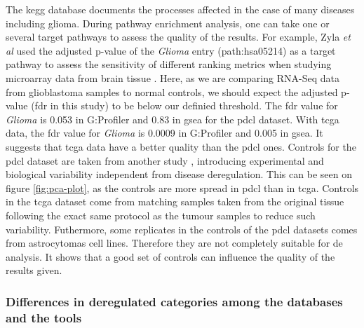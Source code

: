 The \acrshort{kegg} database documents the processes affected in the case of many diseases including glioma.
During pathway enrichment analysis, one can take one or several target pathways to assess the quality of the results.
For example, Zyla \textit{et al} used the adjusted p-value of the \textit{Glioma} entry (path:hsa05214) as a target pathway to assess the sensitivity of different ranking metrics when studying microarray data from brain tissue \cite*{Zyla2017}.
Here, as we are comparing RNA-Seq data from glioblastoma samples to normal controls, we should expect the adjusted p-value (\acrshort{fdr} in this study) to be below our definied threshold.
The \acrshort{fdr} value for \textit{Glioma} is 0.053 in G:Profiler and 0.83 in \acrshort{gsea} for the \acrshort{pdcl} dataset.
With \acrshort{tcga} data, the \acrshort{fdr} value for \textit{Glioma} is 0.0009 in G:Profiler and 0.005 in \acrshort{gsea}.
It suggests that \acrshort{tcga} data have a better quality than the \acrshort{pdcl} ones.
Controls for the \acrshort{pdcl} dataset are taken from another study \cite*{Lundin2018}, introducing experimental and biological variability independent from disease deregulation.
This can be seen on figure \ref*{fig:pca-plot}, as the controls are more spread in \acrshort{pdcl} than in \acrshort{tcga}.
Controls in the \acrshort{tcga} dataset come from matching samples taken from the original tissue following the exact same protocol as the tumour samples to reduce such variability.
Futhermore, some replicates in the controls of the \acrshort{pdcl} datasets comes from astrocytomas cell lines.
Therefore they are not completely suitable for \acrlong{de} analysis.
It shows that a good set of controls can influence the quality of the results given.

\subsubsection{Differences in deregulated categories among the databases and the tools}

